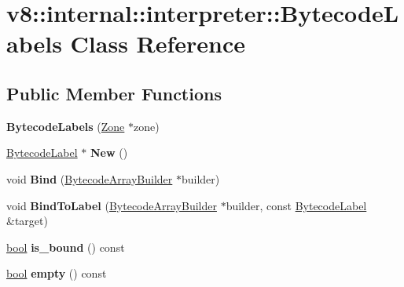 \hypertarget{classv8_1_1internal_1_1interpreter_1_1BytecodeLabels}{}\section{v8\+:\+:internal\+:\+:interpreter\+:\+:Bytecode\+Labels Class Reference}
\label{classv8_1_1internal_1_1interpreter_1_1BytecodeLabels}
\subsection*{Public Member Functions}
\begin{DoxyCompactItemize}
\item 
\mbox{\label{classv8_1_1internal_1_1interpreter_1_1BytecodeLabels_ac9c9438385fce8842f237300bbeaee1d}} 
{\bfseries Bytecode\+Labels} (\mbox{\hyperlink{classv8_1_1internal_1_1Zone}{Zone}} $\ast$zone)
\item 
\mbox{\label{classv8_1_1internal_1_1interpreter_1_1BytecodeLabels_a2b2c1eaa548b6f7e8640281b8b98ec40}} 
\mbox{\hyperlink{classv8_1_1internal_1_1interpreter_1_1BytecodeLabel}{Bytecode\+Label}} $\ast$ {\bfseries New} ()
\item 
\mbox{\label{classv8_1_1internal_1_1interpreter_1_1BytecodeLabels_ab91fd513343ab2672d39818f79914c33}} 
void {\bfseries Bind} (\mbox{\hyperlink{classv8_1_1internal_1_1interpreter_1_1BytecodeArrayBuilder}{Bytecode\+Array\+Builder}} $\ast$builder)
\item 
\mbox{\label{classv8_1_1internal_1_1interpreter_1_1BytecodeLabels_a6a629e75e04ad4777adbc5dd29cc4fe5}} 
void {\bfseries Bind\+To\+Label} (\mbox{\hyperlink{classv8_1_1internal_1_1interpreter_1_1BytecodeArrayBuilder}{Bytecode\+Array\+Builder}} $\ast$builder, const \mbox{\hyperlink{classv8_1_1internal_1_1interpreter_1_1BytecodeLabel}{Bytecode\+Label}} \&target)
\item 
\mbox{\label{classv8_1_1internal_1_1interpreter_1_1BytecodeLabels_a0930daa42baab1bfb09bb8d3b6be5a2c}} 
\mbox{\hyperlink{classbool}{bool}} {\bfseries is\+\_\+bound} () const
\item 
\mbox{\label{classv8_1_1internal_1_1interpreter_1_1BytecodeLabels_a54e7bfa693244cd31bc124b1137998f9}} 
\mbox{\hyperlink{classbool}{bool}} {\bfseries empty} () const
\end{DoxyCompactItemize}


